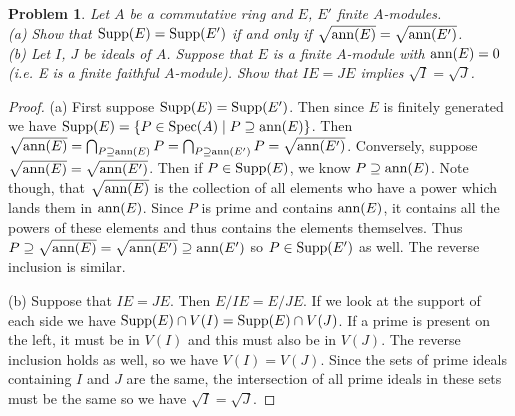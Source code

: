 \documentclass{article}
\newcommand{\supp}{\textup{Supp}}
\newcommand{\ann}{\textup{ann}}
\newcommand{\spec}{\textup{Spec}}
\newtheorem{problem}{Problem}
\begin{document}
\begin{problem}
Let $A$ be a commutative ring and $E$, $E'$ finite $A$-modules.\\
(a) Show that $\supp(E) = \supp(E')$ if and only if $\sqrt{\ann(E)} = \sqrt{\ann(E')}$.\\
(b) Let $I$, $J$ be ideals of $A$. Suppose that $E$ is a finite $A$-module with $\ann(E) = 0$ (i.e. E is a \emph{finite faithful $A$-module}). Show that $IE = JE$ implies $\sqrt{I} = \sqrt{J}$.
\end{problem}
\begin{proof}
(a) First suppose $\supp(E) = \supp(E')$. Then since $E$ is finitely generated we have $\supp(E) = \{P \in \spec(A) \mid P \supseteq \ann(E)\}$. Then $\sqrt{\ann(E)} = \bigcap_{P \supseteq \ann(E)} P = \bigcap_{P \supseteq \ann(E')} P = \sqrt{\ann(E')}$. Conversely, suppose $\sqrt{\ann(E)} = \sqrt{\ann(E')}$. Then if $P \in \supp(E)$, we know $P \supseteq \ann(E)$. Note though, that $\sqrt{\ann(E)}$ is the collection of all elements who have a power which lands them in $\ann(E)$. Since $P$ is prime and contains $\ann(E)$, it contains all the powers of these elements and thus contains the elements themselves. Thus $P \supseteq \sqrt{\ann(E)} = \sqrt{\ann(E')} \supseteq \ann(E')$ so $P \in \supp(E')$ as well. The reverse inclusion is similar.

(b) Suppose that $IE = JE$. Then $E/IE = E/JE$. If we look at the support of each side we have $\supp(E) \cap V(I) = \supp(E) \cap V(J)$. If a prime is present on the left, it must be in $V(I)$ and this must also be in $V(J)$. The reverse inclusion holds as well, so we have $V(I) = V(J)$. Since the sets of prime ideals containing $I$ and $J$ are the same, the intersection of all prime ideals in these sets must be the same so we have $\sqrt{I} = \sqrt{J}$.
\end{proof}
\end{document}
